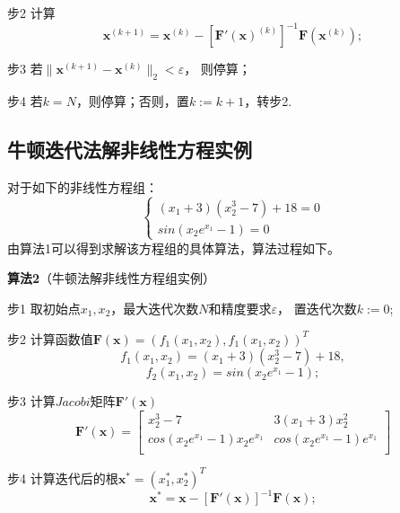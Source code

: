 \documentclass[UTF8,a4paper,12pt]{ctexart}
\begin{document}
   步2 \;计算 
   \begin{displaymath}
	   \boldsymbol{x}^{(k+1)}=\boldsymbol{x}^{(k)}-[\boldsymbol{F}'(\boldsymbol{x})^{(k)}]^{-1}
	   \boldsymbol{F}(\boldsymbol{x}^{(k)}); 
   \end{displaymath}
   
   步3 \;若$\parallel\boldsymbol{x}^{(k+1)}-\boldsymbol{x}^{(k)}\parallel_2<\varepsilon$，
   则停算；
   
   步4 \;若$k=N$，则停算；否则，置$k:=k+1$，转步2.
   
   \subsection{牛顿迭代法解非线性方程实例}
   对于如下的非线性方程组：
   \begin{displaymath}
	   \begin{cases}
		   ({x}_1+3)({x}_2^3-7)+18=0\\
		   sin({x}_2e^{{x}_1}-1)=0
	   \end{cases}	
   \end{displaymath}
   由算法1可以得到求解该方程组的具体算法，算法过程如下。
   
   \textbf{算法2}（牛顿法解非线性方程组实例）
   
   步1 \;取初始点$x_1,x_2$，最大迭代次数$N$和精度要求$\varepsilon$，
   置迭代次数$k:=0$;
   
   步2 \;计算函数值$\boldsymbol{F}(\boldsymbol{x})=(f_1(x_1,x_2),f_1(x_1,x_2))^{T}$
   \begin{displaymath}
	   f_1(x_1,x_2)=({x}_1+3)({x}_2^3-7)+18,
   \end{displaymath}
   \begin{displaymath}
	   f_2(x_1,x_2)=sin({x}_2e^{{x}_1}-1);
   \end{displaymath}
   
   步3 \;计算$Jacobi$矩阵$\boldsymbol{F}'(\boldsymbol{x})$
   \begin{displaymath}
	   \boldsymbol{F}'(\boldsymbol{x})=\begin{bmatrix}
		   x_2^3-7
		   & 3(x_1+3)x_2^2\\
		   
		   cos(x_2e^{x_1}-1)x_2e^{x_1}
		   & cos(x_2e^{x_1}-1)e^{x_1}\\
	   \end{bmatrix}
   \end{displaymath}
   
   步4 \;计算迭代后的根$\boldsymbol{x}^*=(x_1^*,x_2^*)^{T}$
   \begin{displaymath}
	   \boldsymbol{x}^*=\boldsymbol{x}-[\boldsymbol{F}'(\boldsymbol{x})]^{-1}
	   \boldsymbol{F}(\boldsymbol{x}); 
   \end{displaymath}
   
\end{document}
